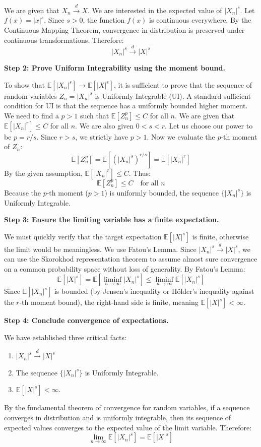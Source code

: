 \begin{solution}
We are given that $X_n \xrightarrow{d} X$.
We are interested in the expected value of $|X_n|^s$. Let $f(x) = |x|^s$. Since $s > 0$, the function $f(x)$ is continuous everywhere.
By the Continuous Mapping Theorem, convergence in distribution is preserved under continuous transformations. Therefore:
\[ |X_n|^s \xrightarrow{d} |X|^s \]

\textbf{Step 2: Prove Uniform Integrability using the moment bound.}

To show that $\mathbb{E}[|X_n|^s] \to \mathbb{E}[|X|^s]$, it is sufficient to prove that the sequence of random variables $Z_n = |X_n|^s$ is Uniformly Integrable (UI).
A standard sufficient condition for UI is that the sequence has a uniformly bounded higher moment. We need to find a $p > 1$ such that $\mathbb{E}[Z_n^p] \leq C$ for all $n$.
We are given that $\mathbb{E}[|X_n|^r] \leq C$ for all $n$.
We are also given $0 < s < r$. Let us choose our power to be $p = r/s$. Since $r > s$, we strictly have $p > 1$.
Now we evaluate the $p$-th moment of $Z_n$:
\[ \mathbb{E}[Z_n^p] = \mathbb{E}[(|X_n|^s)^{r/s}] = \mathbb{E}[|X_n|^r] \]
By the given assumption, $\mathbb{E}[|X_n|^r] \leq C$. Thus:
\[ \mathbb{E}[Z_n^p] \leq C \quad \text{for all } n \]
Because the $p$-th moment ($p>1$) is uniformly bounded, the sequence $\{|X_n|^s\}$ is Uniformly Integrable.

\textbf{Step 3: Ensure the limiting variable has a finite expectation.}

We must quickly verify that the target expectation $\mathbb{E}[|X|^s]$ is finite, otherwise the limit would be meaningless.
We use Fatou's Lemma. Since $|X_n|^s \xrightarrow{d} |X|^s$, we can use the Skorokhod representation theorem to assume almost sure convergence on a common probability space without loss of generality.
By Fatou's Lemma:
\[ \mathbb{E}[|X|^s] = \mathbb{E}\left[ \liminf_{n \to \infty} |X_n|^s \right] \leq \liminf_{n \to \infty} \mathbb{E}[|X_n|^s] \]
Since $\mathbb{E}[|X_n|^s]$ is bounded (by Jensen's inequality or Hölder's inequality against the $r$-th moment bound), the right-hand side is finite, meaning $\mathbb{E}[|X|^s] < \infty$.

\textbf{Step 4: Conclude convergence of expectations.}

We have established three critical facts:
\begin{enumerate}
    \item $|X_n|^s \xrightarrow{d} |X|^s$
    \item The sequence $\{|X_n|^s\}$ is Uniformly Integrable.
    \item $\mathbb{E}[|X|^s] < \infty$.
\end{enumerate}
By the fundamental theorem of convergence for random variables, if a sequence converges in distribution and is uniformly integrable, then its sequence of expected values converges to the expected value of the limit variable.
Therefore:
\[ \lim_{n \to \infty} \mathbb{E}[|X_n|^s] = \mathbb{E}[|X|^s] \]
\end{solution}

